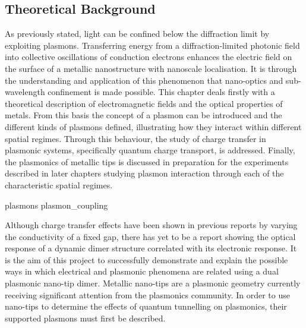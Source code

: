 \documentclass[12pt, a4paper, oneside]{book}
\begin{document}
\begin{singlespace}
{\color{white}
\chapter{Theoretical Background}}
\label{ch:theory}
\end{singlespace}


As previously stated, light can be confined below the diffraction limit by exploiting plasmons. Transferring energy from a diffraction-limited photonic field into collective oscillations of conduction electrons enhances the electric field on the surface of a metallic nanostructure with nanoscale localisation. It is through the understanding and application of this phenomenon that nano-optics and sub-wavelength confinement is made possible.
This chapter deals firstly with a theoretical description of electromagnetic fields and the optical properties of metals. From this basis the concept of a plasmon can be introduced and the different kinds of plasmons defined, illustrating how they interact within different spatial regimes. Through this behaviour, the study of charge transfer in plasmonic systems, specifically quantum charge transport, is addressed. Finally, the plasmonics of metallic tips is discussed in preparation for the experiments described in later chapters studying plasmon interaction through each of the characteristic spatial regimes.

{plasmons}
{plasmon_coupling}

Although charge transfer effects have been shown in previous reports by varying the conductivity of a fixed gap, there has yet to be a report showing the optical response of a dynamic dimer structure correlated with its electronic response. It is the aim of this project to successfully demonstrate and explain the possible ways in which electrical and plasmonic phenomena are related using a dual plasmonic nano-tip dimer. Metallic nano-tips are a plasmonic geometry currently receiving significant attention from the plasmonics community. In order to use nano-tips to determine the effects of quantum tunnelling on plasmonics, their supported plasmons must first be described.
\end{document}
